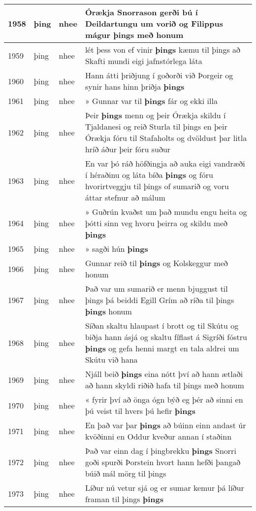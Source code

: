 \documentclass{article}
\begin{document}
\begin{longtable}{p{1cm}|p{1cm}|p{1cm}|p{13cm}}
\hline
1958&þing&nhee&Órækja Snorrason gerði bú í Deildartungu um vorið og Filippus mágur \textbf{þings} með honum\\
\hline
1959&þing&nhee&lét þess von ef vinir \textbf{þings} kæmu til þings að Skafti mundi eigi jafnstórlega láta\\
\hline
1960&þing&nhee&Hann átti þriðjung í goðorði við Þorgeir og synir hans hinn þriðja \textbf{þings} \\
\hline
1961&þing&nhee&» Gunnar var til \textbf{þings} fár og ekki illa\\
\hline
1962&þing&nhee&Þeir \textbf{þings} menn og þeir Órækja skildu í Tjaldanesi og reið Sturla til þings en þeir Órækja fóru til Stafaholts og dvöldust þar litla hríð áður þeir fóru suður\\
\hline
1963&þing&nhee&En var þó ráð höfðingja að auka eigi vandræði í héraðinu og láta bíða \textbf{þings} og fóru hvorirtveggju til þings of sumarið og voru áttar stefnur að málum\\
\hline
1964&þing&nhee&» Guðrún kvaðst um það mundu engu heita og þótti sinn veg hvoru þeirra og skildu með \textbf{þings} \\
\hline
1965&þing&nhee&» sagði hún \textbf{þings} \\
\hline
1966&þing&nhee&Gunnar reið til \textbf{þings} og Kolskeggur með honum\\
\hline
1967&þing&nhee&Það var um sumarið er menn bjuggust til þings þá beiddi Egill Grím að ríða til þings \textbf{þings} honum\\
\hline
1968&þing&nhee&Síðan skaltu hlaupast í brott og til Skútu og biðja hann ásjá og skaltu fíflast á Sigríði fóstru \textbf{þings} og gefa henni margt en tala aldrei um Skútu við hana\\
\hline
1969&þing&nhee&Njáll beið \textbf{þings} eina nótt því að hann ætlaði að hann skyldi riðið hafa til þings með honum\\
\hline
1970&þing&nhee&« fyrir því að önga ógn býð eg þér að sinni en þú veist til hvers þú hefir \textbf{þings} \\
\hline
1971&þing&nhee&En það var þar \textbf{þings} að búinn einn andast úr kvöðinni en Oddur kveður annan í staðinn\\
\hline
1972&þing&nhee&Það var einn dag í þingbrekku \textbf{þings} Snorri goði spurði Þorstein hvort hann hefði þangað búið mál mörg til þings\\
\hline
1973&þing&nhee&Líður nú vetur sjá og er sumar kemur þá líður framan til þings \textbf{þings} \\

\end{longtable}
\end{document}
